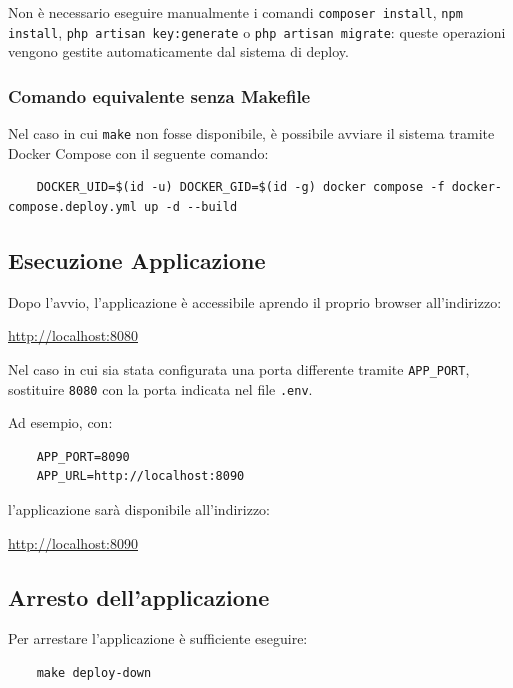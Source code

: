 \documentclass[a4paper,10pt]{article}
\begin{document}
Non è necessario eseguire manualmente i comandi \texttt{composer install}, \texttt{npm install}, \texttt{php artisan key:generate} o \texttt{php artisan migrate}: queste operazioni vengono gestite automaticamente dal sistema di deploy.

\subsubsection{Comando equivalente senza Makefile}
Nel caso in cui \texttt{make} non fosse disponibile, è possibile avviare il sistema tramite Docker Compose con il seguente comando:

\begin{lstlisting}
    DOCKER_UID=$(id -u) DOCKER_GID=$(id -g) docker compose -f docker-compose.deploy.yml up -d --build
\end{lstlisting}

\subsection{Esecuzione Applicazione}
Dopo l'avvio, l'applicazione è accessibile aprendo il proprio browser all'indirizzo:

\begin{center}
  \href{http://localhost:8080}{http://localhost:8080}
\end{center}

Nel caso in cui sia stata configurata una porta differente tramite \texttt{APP\_PORT}, sostituire \texttt{8080} con la porta indicata nel file \texttt{.env}.

Ad esempio, con:

\begin{lstlisting}
    APP_PORT=8090
    APP_URL=http://localhost:8090
\end{lstlisting}

l'applicazione sarà disponibile all'indirizzo:

\begin{center}
  \href{http://localhost:8090}{http://localhost:8090}
\end{center}

\subsection{Arresto dell'applicazione}
Per arrestare l'applicazione è sufficiente eseguire:

\begin{lstlisting}
    make deploy-down
\end{lstlisting}
\end{document}
